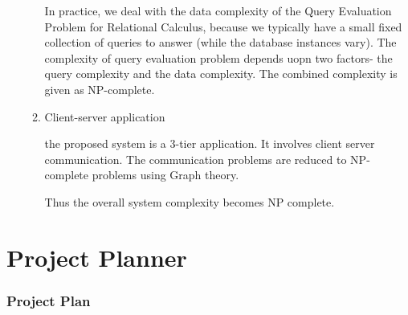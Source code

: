 \documentclass[oneside,a4paper,12pt]{book}
\begin{document}
\begin{appendices}
\begin{itemize}
\begin{enumerate}
In practice, we deal with the data complexity of the Query Evaluation Problem for Relational Calculus,
because we typically have a small fixed collection of queries to answer (while the database instances vary).
The complexity of query evaluation problem depends uopn two factors- the query complexity and the data complexity. The combined complexity is given as NP-complete.
\item Client-server application

the proposed system is a 3-tier application.
It involves client server communication. The communication problems are reduced to NP-complete problems using Graph theory.

Thus the overall system complexity becomes NP complete.
\end{enumerate}















\end{itemize}



\chapter{Project Planner}
\label{app:plan}
\subsection{Project Plan}
 \begin{center}
	\begin{figure}[!htbp]
		\centering
		

\end{figure}
\end{center}
\end{appendices}
\end{document}
